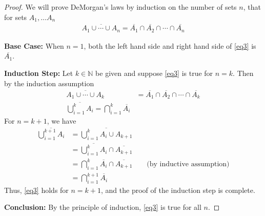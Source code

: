 \documentclass[11pt, oneside]{article}   	%
\begin{document}
\begin{proof}
We will prove DeMorgan's laws by induction on the number of sets $n$, that for sets $A_1, \ldots A_n$
\begin{align}
	\overline{A_1 \cup \cdots \cup A_n} = \overline{A_1} \cap \overline{A_2} \cap \cdots \cap \overline{A_n}
	\label{eq3}
\end{align}

\textbf{Base Case:} When $n=1$, both the left hand side and right hand side of \eqref{eq3} is $\overline{A_1}$.

\textbf{Induction Step:} Let $k \in \mathbb{N}$ be given and suppose \eqref{eq3} is true for $n=k$. Then by the induction assumption
\begin{align*}
	\overline{A_1 \cup \cdots \cup A_k} & = \overline{A_1} \cap \overline{A_2} \cap \cdots \cap \overline{A_k} \\
	\overline{\bigcup_{i=1}^k A_i} = \bigcap_{i=1}^k \overline{A_i}
\end{align*}
For $n=k+1$, we have
\begin{align*}
	\overline{\bigcup_{i=1}^{k+1} A_i} & =  \overline{\bigcup_{i=1}^{k} A_i \cup A_{k+1}} \\
	& =  \overline{\bigcup_{i=1}^{k} A_i} \cap \overline{A_{k+1}} \\
	& =  \bigcap_{i=1}^k \overline{A_i} \cap \overline{A_{k+1}} \qquad \text{(by inductive assumption)} \\
	& = \bigcap_{i=1}^{k+1} \overline{A_i} 
\end{align*}
Thus, \eqref{eq3} holds for $n=k+1$, and the proof of the induction step is complete.

\textbf{Conclusion:} By the principle of induction, \eqref{eq3} is true for all $n$.
\end{proof}
\end{document}

